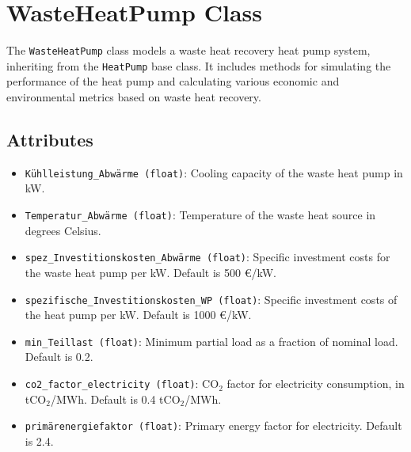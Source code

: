 \section{WasteHeatPump Class}
The \texttt{WasteHeatPump} class models a waste heat recovery heat pump system, inheriting from the \texttt{HeatPump} base class. It includes methods for simulating the performance of the heat pump and calculating various economic and environmental metrics based on waste heat recovery.

\subsection{Attributes}
\begin{itemize}
    \item \texttt{Kühlleistung\_Abwärme (float)}: Cooling capacity of the waste heat pump in kW.
    \item \texttt{Temperatur\_Abwärme (float)}: Temperature of the waste heat source in degrees Celsius.
    \item \texttt{spez\_Investitionskosten\_Abwärme (float)}: Specific investment costs for the waste heat pump per kW. Default is 500 €/kW.
    \item \texttt{spezifische\_Investitionskosten\_WP (float)}: Specific investment costs of the heat pump per kW. Default is 1000 €/kW.
    \item \texttt{min\_Teillast (float)}: Minimum partial load as a fraction of nominal load. Default is 0.2.
    \item \texttt{co2\_factor\_electricity (float)}: CO$_2$ factor for electricity consumption, in tCO$_2$/MWh. Default is 0.4 tCO$_2$/MWh.
    \item \texttt{primärenergiefaktor (float)}: Primary energy factor for electricity. Default is 2.4.
\end{itemize}

